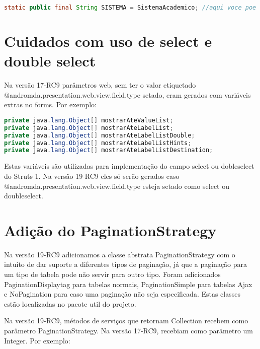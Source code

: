 \begin{framed}
\begin{lstlisting}[language=java]
static public final String SISTEMA = SistemaAcademico; //aqui voce poe o valor do atributo application.id do build.properties do projeto static public final Integer TABLE\_LINES = 20; static public final Integer TABLE_PAGES = 10;
\end{lstlisting}
\end{framed}

\section{Cuidados com uso de select e double select}
Na versão 17-RC9 parâmetros web, sem ter o valor etiquetado
@andromda.presentation.web.view.field.type setado, eram gerados com variáveis extras no forms. Por exemplo:

\begin{framed}
\begin{lstlisting}[language=java]
private java.lang.Object[] mostrarAteValueList;
private java.lang.Object[] mostrarAteLabelList;
private java.lang.Object[] mostrarAteLabelListDouble;
private java.lang.Object[] mostrarAteLabelListHints;
private java.lang.Object[] mostrarAteLabelListDestination;
\end{lstlisting}
\end{framed}

Estas variáveis são utilizadas para implementação do campo select ou dobleselect
do Struts 1. Na versão 19-RC9 eles só serão gerados caso @andromda.presentation.web.view.field.type esteja setado como select ou doubleselect. 

\section{Adição do PaginationStrategy}
Na versão 19-RC9 adicionamos a classe abstrata PaginationStrategy com o intuito
de dar suporte a diferentes tipos de paginação, já que a paginação para um tipo de tabela pode não servir para outro tipo. Foram adicionados PaginationDisplaytag para tabelas normais, PaginationSimple para tabelas Ajax e NoPagination para caso uma paginação não seja especificada. Estas classes estão localizadas no pacote util do projeto.

Na versão 19-RC9, métodos de serviços que retornam Collection recebem como
parâmetro PaginationStrategy. Na versão 17-RC9,  recebiam como parâmetro um Integer. Por exemplo:

